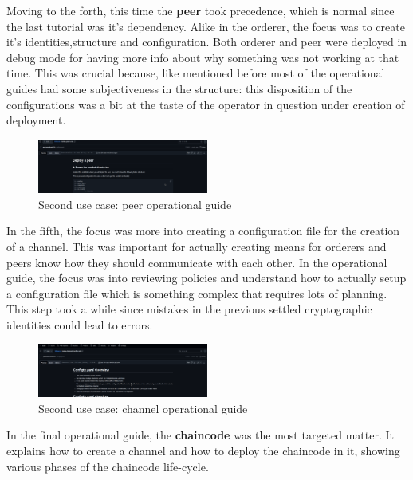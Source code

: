 Moving to the forth, this time the \textbf{peer} took precedence, which is normal since the last tutorial was it's dependency. Alike in the
orderer, the focus was to create it's identities,structure and configuration. Both orderer and peer were deployed in debug mode for having 
more info about why something was not working at that time. This was crucial because, like mentioned before most of the operational 
guides had some subjectiveness in the structure: this disposition of the configurations was a bit at the taste of the operator in 
question under creation of deployment.

\begin{figure}[H]
    \centering
    \includegraphics[width=0.5\textwidth]{assets/use-case-2/notes-peers.png} %
    \caption{Second use case: peer operational guide}
    \label{fig:sample-image} 
\end{figure}

In the fifth, the focus was more into creating a configuration file for the creation of a channel. This was important for actually creating 
means for orderers and peers know how they should communicate with each other. In the operational guide, the focus was into 
reviewing policies and understand how to actually setup a configuration file which is something complex that requires lots of 
planning. This step took a while since mistakes in the previous settled cryptographic identities could lead to errors. 

\begin{figure}[H]
    \centering
    \includegraphics[width=0.5\textwidth]{assets/use-case-2/notes-channel.png} %
    \caption{Second use case: channel operational guide}
    \label{fig:sample-image} 
\end{figure}

In the final operational guide, the \textbf{chaincode} was the most targeted matter.  It explains how to create a channel and 
how to deploy the chaincode in it, showing various phases of the chaincode life-cycle.

